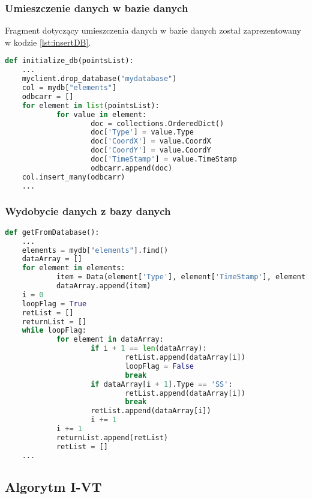 \subsubsection{Umieszczenie danych w bazie danych}
Fragment dotyczący umieszczenia danych w bazie danych został zaprezentowany w kodzie \ref{lst:insertDB}. 
\begin{lstlisting}[language=Python, caption=Umieszczenie danych w bazie danych, label={lst:insertDB}]
def initialize_db(pointsList):
    ...
    myclient.drop_database("mydatabase")
    col = mydb["elements"]
    odbcarr = []
    for element in list(pointsList):
            for value in element:
                    doc = collections.OrderedDict()
                    doc['Type'] = value.Type
                    doc['CoordX'] = value.CoordX
                    doc['CoordY'] = value.CoordY
                    doc['TimeStamp'] = value.TimeStamp
                    odbcarr.append(doc)
    col.insert_many(odbcarr)
    ...
\end{lstlisting}
\subsubsection{Wydobycie danych z bazy danych}
\begin{lstlisting}[language=Python, caption=Wydobycie danych z bazy danych, label={lst:getFromDB}]
def getFromDatabase():
    ...
    elements = mydb["elements"].find()
    dataArray = []
    for element in elements:
            item = Data(element['Type'], element['TimeStamp'], element['CoordX'], element['CoordY'])
            dataArray.append(item)
    i = 0
    loopFlag = True
    retList = []
    returnList = []
    while loopFlag:
            for element in dataArray:
                    if i + 1 == len(dataArray):
                            retList.append(dataArray[i])
                            loopFlag = False
                            break
                    if dataArray[i + 1].Type == 'SS':
                            retList.append(dataArray[i])
                            break
                    retList.append(dataArray[i])
                    i += 1
            i += 1
            returnList.append(retList)
            retList = []
    ...
    \end{lstlisting}
\subsection{Algorytm I-VT}
\blindtext
